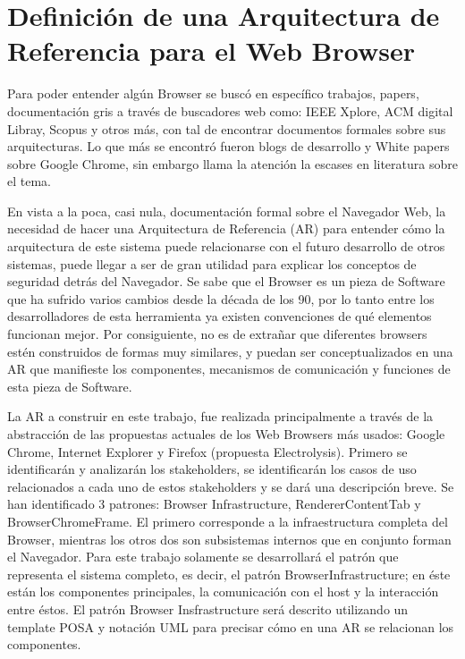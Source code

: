 \chapter{Definición de una Arquitectura de Referencia para el Web Browser}
\label{chap5:ArqRefWB}


Para poder entender algún Browser se buscó en específico trabajos, papers, documentación gris a través de buscadores web como: IEEE Xplore, ACM digital Libray, Scopus y otros más, con tal de encontrar documentos formales sobre sus arquitecturas. Lo que más se encontró fueron blogs de desarrollo y White papers sobre Google Chrome, sin embargo llama la atención la escases en literatura sobre el tema. 


En vista a la poca, casi nula, documentación formal sobre el Navegador Web, la necesidad de hacer una Arquitectura de Referencia (AR) para entender cómo la arquitectura de este sistema puede relacionarse con el futuro desarrollo de otros sistemas, puede llegar a ser de gran utilidad para explicar los conceptos de seguridad detrás del Navegador. Se sabe que el Browser es un pieza de Software que ha sufrido varios cambios desde la década de los 90, por lo tanto entre los desarrolladores de esta herramienta ya existen convenciones de qué elementos funcionan mejor. Por consiguiente, no es de extrañar que diferentes browsers estén construidos de formas muy similares, y puedan ser conceptualizados en una AR que manifieste los componentes, mecanismos de comunicación y funciones de esta pieza de Software. 


La AR a construir en este trabajo, fue realizada principalmente a través de la abstracción de las propuestas actuales de los Web Browsers más usados: Google Chrome, Internet Explorer y Firefox (propuesta Electrolysis). Primero se identificarán y analizarán los stakeholders, se identificarán los casos de uso relacionados a cada uno de estos stakeholders y se dará una descripción breve. Se han identificado 3 patrones: Browser Infrastructure, RendererContentTab y BrowserChromeFrame. El primero corresponde a la infraestructura completa del Browser, mientras los otros dos son subsistemas internos que en conjunto forman el Navegador. Para este trabajo solamente se desarrollará el patrón que representa el sistema completo, es decir, el patrón BrowserInfrastructure; en éste están los componentes principales, la comunicación con el host y la interacción entre éstos. El patrón Browser Insfrastructure será descrito utilizando un template POSA \cite{buschman1996system} y notación UML para precisar cómo en una AR se relacionan los componentes. 

